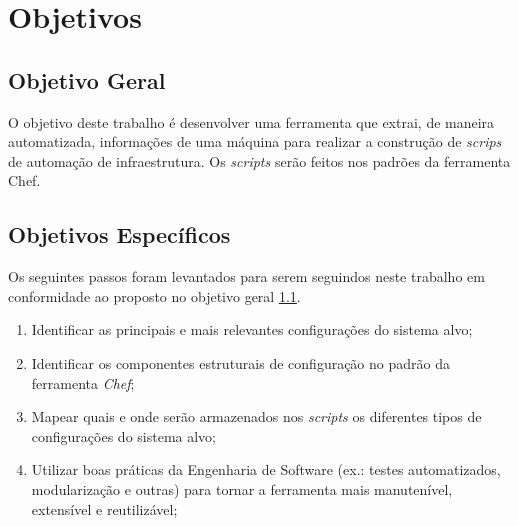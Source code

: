 \section{Objetivos}
\label{sec:obj}

\subsection{Objetivo Geral}
\label{sec:obj-grl}

O objetivo deste trabalho é desenvolver uma ferramenta que extrai,
de maneira automatizada, informações de uma máquina para realizar
a construção de \textit{scrips} de automação de infraestrutura. Os \textit{scripts}
serão feitos nos padrões da ferramenta Chef.

\subsection{Objetivos Específicos}
\label{sec:obj-esp}

Os seguintes passos foram levantados para serem seguindos neste trabalho
em conformidade ao proposto no objetivo geral \ref{sec:obj-grl}.

\begin{enumerate}
  \item Identificar as principais e mais relevantes configurações do sistema
  alvo;
  \item Identificar os componentes estruturais de configuração no padrão da
    ferramenta \textit{Chef};
  \item Mapear quais e onde serão armazenados nos \textit{scripts} os
  diferentes tipos de configurações do sistema alvo;
  \item Utilizar boas práticas da Engenharia de Software (ex.: testes
  automatizados, modularização e outras) para tornar a ferramenta mais
  manutenível, extensível e reutilizável;
\end{enumerate}
